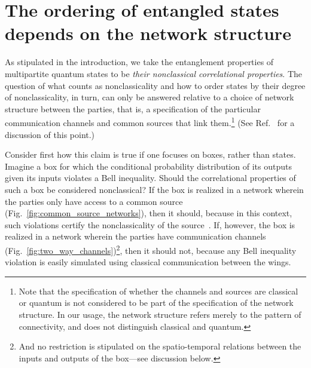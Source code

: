 \documentclass[prx,11pt,letterpaper,twocolumn,accepted=2023-11-27]{quantumarticle}
\theoremstyle{plain}
\theoremstyle{definition}
\begin{document}
\section{The ordering of entangled states depends on the network structure}\label{NetworkStructure}

As stipulated in the introduction, we take the entanglement properties of multipartite quantum states to be {\em their nonclassical correlational properties}. 
  The question of 
what counts as nonclassicality and how to order states by their degree of nonclassicality,
 in turn,  can only be answered relative to a choice of network structure between the parties, that is, a specification of 
 the particular communication channels and common sources that link them.\footnote{Note that the specification of whether the channels and sources are classical or quantum  is not considered to be part of the specification of the network structure.  In our usage, the network structure refers merely to the pattern of connectivity, and does not distinguish classical and quantum. } (See Ref.~\cite{wolfe2020quantifying} for a discussion of this point.)

Consider first how this claim is true if one focuses on boxes, rather than states.
Imagine a box for which the conditional probability distribution of its outputs given its inputs violates a Bell inequality.  Should the correlational properties of such a box be considered nonclassical?   If the box is realized in a network wherein the parties only have access to a common source (Fig.~\ref{fig:common_source_networks}), then it should, because in this context, such violations certify the nonclassicality of the source~\cite{Wood2015}.  If, however, the box is realized in a network wherein the parties have communication channels  (Fig.~\ref{fig:two_way_channels})\footnote{And no restriction is stipulated on the spatio-temporal relations between the inputs and outputs of the box---see discussion below.}, then it should not, because any Bell inequality violation is easily simulated using classical communication between the wings.
\end{document}
